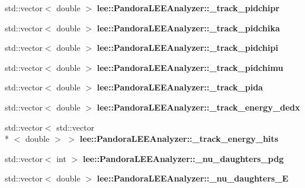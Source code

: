 \begin{DoxyCompactItemize}
\item 
\hypertarget{group__lee_gaecf90a4b535a1eea4a2e46efaed73aee}{std\-::vector$<$ double $>$ {\bfseries lee\-::\-Pandora\-L\-E\-E\-Analyzer\-::\-\_\-track\-\_\-pidchipr}}\label{group__lee_gaecf90a4b535a1eea4a2e46efaed73aee}

\item 
\hypertarget{group__lee_gacd3a6086b23d0242a02a1aaafaa22f21}{std\-::vector$<$ double $>$ {\bfseries lee\-::\-Pandora\-L\-E\-E\-Analyzer\-::\-\_\-track\-\_\-pidchika}}\label{group__lee_gacd3a6086b23d0242a02a1aaafaa22f21}

\item 
\hypertarget{group__lee_gaecc3128a6d2e1ce777b2a47cf8d8592e}{std\-::vector$<$ double $>$ {\bfseries lee\-::\-Pandora\-L\-E\-E\-Analyzer\-::\-\_\-track\-\_\-pidchipi}}\label{group__lee_gaecc3128a6d2e1ce777b2a47cf8d8592e}

\item 
\hypertarget{group__lee_ga92b6e7aa446dda4b3fb5ef6a523417d3}{std\-::vector$<$ double $>$ {\bfseries lee\-::\-Pandora\-L\-E\-E\-Analyzer\-::\-\_\-track\-\_\-pidchimu}}\label{group__lee_ga92b6e7aa446dda4b3fb5ef6a523417d3}

\item 
\hypertarget{group__lee_ga51862c538bdadd1819aa4cc47f37daab}{std\-::vector$<$ double $>$ {\bfseries lee\-::\-Pandora\-L\-E\-E\-Analyzer\-::\-\_\-track\-\_\-pida}}\label{group__lee_ga51862c538bdadd1819aa4cc47f37daab}

\item 
\hypertarget{group__lee_ga548f84dc28b54f42d917780967237fbb}{std\-::vector$<$ double $>$ {\bfseries lee\-::\-Pandora\-L\-E\-E\-Analyzer\-::\-\_\-track\-\_\-energy\-\_\-dedx}}\label{group__lee_ga548f84dc28b54f42d917780967237fbb}

\item 
\hypertarget{group__lee_ga78b31424830aa3c041dbff599185c3bb}{std\-::vector$<$ std\-::vector\\*
$<$ double $>$ $>$ {\bfseries lee\-::\-Pandora\-L\-E\-E\-Analyzer\-::\-\_\-track\-\_\-energy\-\_\-hits}}\label{group__lee_ga78b31424830aa3c041dbff599185c3bb}

\item 
\hypertarget{group__lee_gaaacddd2332477a23f786ee4c854d3e61}{std\-::vector$<$ int $>$ {\bfseries lee\-::\-Pandora\-L\-E\-E\-Analyzer\-::\-\_\-nu\-\_\-daughters\-\_\-pdg}}\label{group__lee_gaaacddd2332477a23f786ee4c854d3e61}

\item 
\hypertarget{group__lee_gac1d71f8ed82068b3a02d9a37905bf195}{std\-::vector$<$ double $>$ {\bfseries lee\-::\-Pandora\-L\-E\-E\-Analyzer\-::\-\_\-nu\-\_\-daughters\-\_\-\-E}}\label{group__lee_gac1d71f8ed82068b3a02d9a37905bf195}


\end{DoxyCompactItemize}
